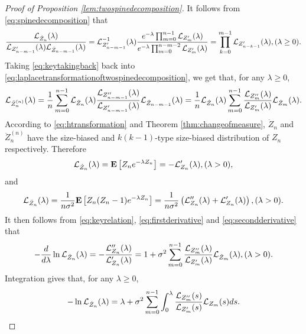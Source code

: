 \documentclass[12pt]{amsart}
\theoremstyle{remark}
\numberwithin{equation}{section}
\newcommand{\expr}[1]{\left( #1 \right)}
\newcommand{\brac}[1]{\left[ #1 \right]}
\newcommand{\expct}{\mathbf E}
\begin{document}
\begin{proof}[Proof of Proposition \ref{lem:twospinedecomposition}]
    It follows from \eqref{eq:spinedecomposition} that 
\begin{multline}
\label{eq:keytakingback}
	    \frac{\mathcal L_{\dot Z_n}(\lambda)}{\mathcal L_{Z_{n-m-1}'}(\lambda)\mathcal L_{\dot Z_{n-m-1}}(\lambda)}
	= 
	    \mathcal L_{Z_{n-m-1}'}^{-1}(\lambda)\frac{e^{-\lambda}\prod_{m=0}^{n-1}\mathcal L_{Z'_m}(\lambda)}{e^{-\lambda}\prod_{m=0}^{n-m-2}\mathcal L_{Z'_m}(\lambda)}
	=
	    \prod_{k=0}^{m-1}\mathcal L_{Z'_{n-k-1}}(\lambda)
	,(\lambda\geq 0).
\end{multline}
    Taking \eqref{eq:keytakingback} back into \eqref{eq:laplacetransformationoftwospinedecomposition}, we get that, for any $\lambda\geq 0$,
\begin{equation}
\label{eq:keyrelation}
        \mathcal L_{\ddot Z_n^{(n)}}(\lambda)
	=
        \frac{1}{n}\sum_{m=0}^{n-1}\mathcal L_{\dot Z_n}(\lambda)\frac{\mathcal L_{Z''_{n-m-1}}(\lambda)}{\mathcal L_{Z_{n-m-1}'}(\lambda)}\mathcal L_{\dot Z_{n-m-1}}(\lambda)
    =
        \frac{1}{n}\mathcal L_{\dot Z_n}(\lambda)\sum_{m=0}^{n-1}\frac{\mathcal L_{Z''_m}(\lambda)}{\mathcal L_{Z'_m}(\lambda)}\mathcal L_{\dot Z_m}(\lambda).
\end{equation}
    According to \eqref{eq:htransformation} and Theorem \ref{thm:changeofmeasure}, $\dot Z_n$ and $\ddot Z_n^{(n)}$ have the size-biased and $k(k-1)$-type size-biased distribution of $Z_n$ respectively. Therefore
\begin{equation}
\label{eq:firstderivative}
        \cL_{\dot Z_n}(\lambda)
	= 
	    \expct\brac{Z_n e^{-\lambda Z_n}}
	=
	    -\cL_{Z_n}'(\lambda)
	,(\lambda > 0),
\end{equation}
    and
\begin{equation}
\label{eq:secondderivative}
        \cL_{\ddot Z_n}(\lambda)
	=
		\frac{1}{n\sigma^2}\expct\brac{Z_n(Z_n-1)e^{-\lambda Z_n}}
	=
		\frac{1}{n\sigma^2}\expr{\cL_{Z_n}''(\lambda)+\cL_{Z_n}'(\lambda)}
	,(\lambda > 0).
\end{equation}
It then follows from \eqref{eq:keyrelation}, \eqref{eq:firstderivative} and \eqref{eq:secondderivative} that
\begin{equation*}
		-\frac{d}{d\lambda}\ln \mathcal L_{\dot Z_n}(\lambda)
	=
		-\frac{\mathcal L_{Z_n}''(\lambda)}{\mathcal L_{Z_n}'(\lambda)}
	=
		1+\sigma^2\sum_{m=0}^{n-1}\frac{\mathcal L_{Z''_{m}}(\lambda)}{\mathcal L_{Z'_{m}}(\lambda)}\mathcal L_{\dot Z_{m}}(\lambda),
	(\lambda > 0).
\end{equation*}
	Integration gives that, for any $\lambda\geq 0$,
\begin{equation*}
		-\ln \mathcal L_{\dot Z_n}(\lambda)
	=
		\lambda
	+
		\sigma^2\sum_{m=0}^{n-1}\int_0^\lambda \frac{\mathcal L_{Z''_{m}}(s)}{\mathcal L_{Z'_{m}}(s)}\mathcal L_{Z_m}(s)ds.
\end{equation*}
\end{proof}
\end{document}
